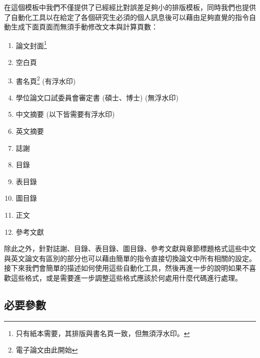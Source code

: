 \documentclass[12pt]{report}
\theoremstyle{plain}
\begin{document}
在這個模板中我們不僅提供了已經經比對誤差足夠小的排版模板，同時我們也提供了自動化工具以在給定了各個研究生必須的個人訊息後可以藉由足夠直覺的指令自動生成下面頁面而無須手動修改文本與計算頁數：
\begin{enumerate}
    \item 論文封面\footnote{只有紙本需要，其排版與書名頁一致，但無須浮水印。}
    \item 空白頁
    \item 書名頁\footnote{電子論文由此開始} (有浮水印)
    \item 學位論文口試委員會審定書 (碩士、博士) (無浮水印)
    \item 中文摘要 (以下皆需要有浮水印)
    \item 英文摘要
    \item 誌謝
    \item 目錄
    \item 表目錄
    \item 圖目錄
    \item 正文
    \item 參考文獻
\end{enumerate}
除此之外，針對誌謝、目錄、表目錄、圖目錄、參考文獻與章節標題格式這些中文與英文論文有區別的部分也可以藉由簡單的指令直接切換論文中所有相關的設定。接下來我們會簡單的描述如何使用這些自動化工具，然後再進一步的說明如果不喜歡這些格式，或是需要進一步調整這些格式應該於何處用什麼代碼進行處理。

\subsection{必要參數}
\end{document}
